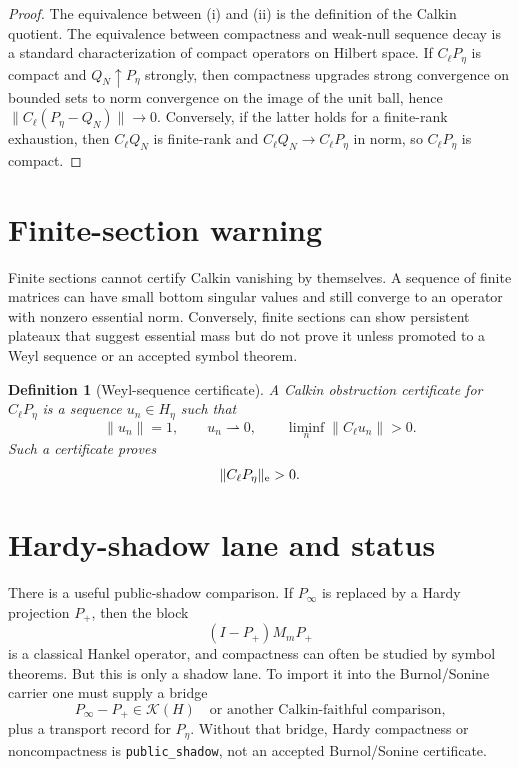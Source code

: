 \documentclass[11pt]{article}
\newtheorem{definition}{Definition}
\begin{document}
\begin{proof}
The equivalence between (i) and (ii) is the definition of the Calkin quotient.  The equivalence between compactness and weak-null sequence decay is a standard characterization of compact operators on Hilbert space.  If \(C_\ell P_\eta\) is compact and \(Q_N\uparrow P_\eta\) strongly, then compactness upgrades strong convergence on bounded sets to norm convergence on the image of the unit ball, hence \(\|C_\ell(P_\eta-Q_N)\|\to0\).  Conversely, if the latter holds for a finite-rank exhaustion, then \(C_\ell Q_N\) is finite-rank and \(C_\ell Q_N\to C_\ell P_\eta\) in norm, so \(C_\ell P_\eta\) is compact.
\end{proof}

\section*{Finite-section warning}
Finite sections cannot certify Calkin vanishing by themselves.  A sequence of finite matrices can have small bottom singular values and still converge to an operator with nonzero essential norm.  Conversely, finite sections can show persistent plateaux that suggest essential mass but do not prove it unless promoted to a Weyl sequence or an accepted symbol theorem.

\begin{definition}[Weyl-sequence certificate]
A Calkin obstruction certificate for \(C_\ell P_\eta\) is a sequence \(u_n\in H_\eta\) such that
\[
  \|u_n\|=1,
  \qquad u_n\rightharpoonup0,
  \qquad \liminf_n\|C_\ell u_n\|>0.
\]
Such a certificate proves
\[
  \|C_\ell P_\eta\|_{\rm e}>0.
\]
\end{definition}

\section*{Hardy-shadow lane and status}
There is a useful public-shadow comparison.  If \(P_\infty\) is replaced by a Hardy projection \(P_+\), then the block
\[
  (I-P_+)M_mP_+
\]
is a classical Hankel operator, and compactness can often be studied by symbol theorems.  But this is only a shadow lane.  To import it into the Burnol/Sonine carrier one must supply a bridge
\[
  P_\infty-P_+\in\mathcal K(H)
  \quad\text{or another Calkin-faithful comparison,}
\]
plus a transport record for \(P_\eta\).  Without that bridge, Hardy compactness or noncompactness is \texttt{public\_shadow}, not an accepted Burnol/Sonine certificate.
\end{document}

